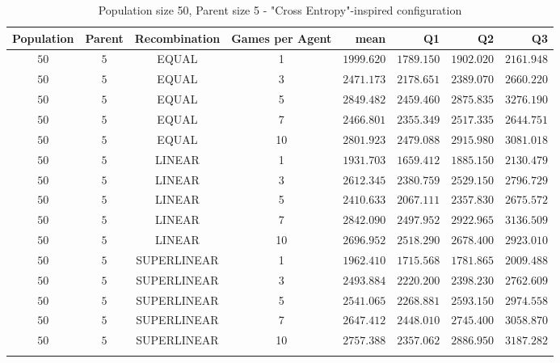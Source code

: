 \begin{table}[H]
\centering
\small
\begin{tabular}{c c c c r r r r}
Population & Parent & Recombination & Games per Agent & mean & Q1 & Q2 & Q3\\
\hline
$50$ & $5$ & EQUAL & 1 & $1999.620$ & $1789.150$ & $1902.020$ & $2161.948$\\
$50$ & $5$ & EQUAL & 3 & $2471.173$ & $2178.651$ & $2389.070$ & $2660.220$\\
$50$ & $5$ & EQUAL & 5 & $2849.482$ & $2459.460$ & $2875.835$ & $3276.190$\\
$50$ & $5$ & EQUAL & 7 & $2466.801$ & $2355.349$ & $2517.335$ & $2644.751$\\
\hdashline
$50$ & $5$ & EQUAL & 10 & $2801.923$ & $2479.088$ & $2915.980$ & $3081.018$\\
\hdashline
$50$ & $5$ & LINEAR & 1 & $1931.703$ & $1659.412$ & $1885.150$ & $2130.479$\\
$50$ & $5$ & LINEAR & 3 & $2612.345$ & $2380.759$ & $2529.150$ & $2796.729$\\
$50$ & $5$ & LINEAR & 5 & $2410.633$ & $2067.111$ & $2357.830$ & $2675.572$\\
\hdashline
$50$ & $5$ & LINEAR & 7 & $2842.090$ & $2497.952$ & $2922.965$ & $3136.509$\\
\hdashline
$50$ & $5$ & LINEAR & 10 & $2696.952$ & $2518.290$ & $2678.400$ & $2923.010$\\
$50$ & $5$ & SUPERLINEAR & 1 & $1962.410$ & $1715.568$ & $1781.865$ & $2009.488$\\
$50$ & $5$ & SUPERLINEAR & 3 & $2493.884$ & $2220.200$ & $2398.230$ & $2762.609$\\
$50$ & $5$ & SUPERLINEAR & 5 & $2541.065$ & $2268.881$ & $2593.150$ & $2974.558$\\
$50$ & $5$ & SUPERLINEAR & 7 & $2647.412$ & $2448.010$ & $2745.400$ & $3058.870$\\
\hdashline
$50$ & $5$ & SUPERLINEAR & 10 & $2757.388$ & $2357.062$ & $2886.950$ & $3187.282$\\
\hdashline
\end{tabular}
\caption{Population size 50, Parent size 5 - "Cross Entropy"-inspired configuration}
\end{table}

